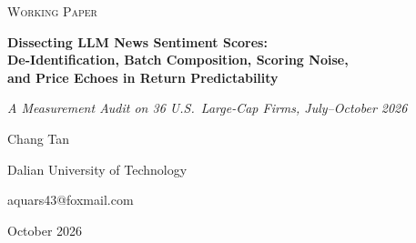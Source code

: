 \thispagestyle{plain}
\enlargethispage{24pt}

\begin{center}
{\color{darkgray}\scshape Working Paper}\par
\vspace{8pt}
{\LARGE\bfseries\color{black} Dissecting LLM News Sentiment Scores:}\\[4pt]
{\LARGE\bfseries\color{black} De-Identification, Batch Composition, Scoring Noise,}\\[4pt]
{\LARGE\bfseries\color{black} and Price Echoes in Return Predictability}\par
\vspace{12pt}
{\large\itshape A Measurement Audit on 36 U.S.\ Large-Cap Firms, July--October 2026}\par
\vspace{14pt}
{\normalsize Chang Tan}\par
{\small\color{darkgray} Dalian University of Technology}\par
{\small\color{darkgray} aquars43@foxmail.com}\par
\vspace{6pt}
{\small\color{darkgray} October 2026}\par
\end{center}


